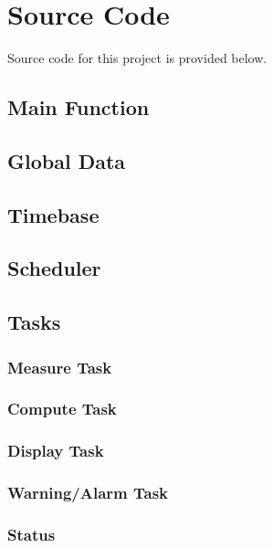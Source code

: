 \documentclass[12pt]{article} %
\begin{document}
    \pagebreak

    \section{Source Code}

    Source code for this project is provided below.

    \subsection{Main Function}
    

    \subsection{Global Data}
    
    

    \subsection{Timebase}
    

    \subsection{Scheduler}
    
    

    \subsection{Tasks}
    \subsubsection{Measure Task}
    
    

    \subsubsection{Compute Task}
    
    

    \subsubsection{Display Task}
    
    

    \subsubsection{Warning/Alarm Task}
    
    

    \subsubsection{Status}
    
    

    
\end{document}
